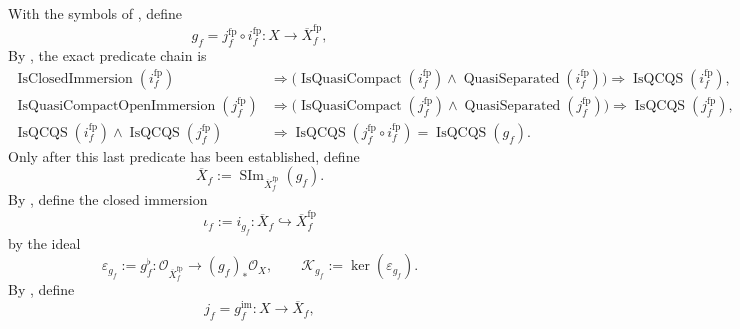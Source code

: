 \begin{definition}
\checked
  \label{def:nagata-final-compactification}
  \lean{}

  With the symbols of
  ,
  define
  \[
    g_f=j_f^{\mathrm{fp}}\circ i_f^{\mathrm{fp}}
      \colon X\longrightarrow\overline X_f^{\mathrm{fp}},
  \]
  By ,
  the exact predicate chain is
  \[
  \begin{aligned}
    \operatorname{IsClosedImmersion}(i_f^{\mathrm{fp}})
      &\Longrightarrow
        \bigl(
          \operatorname{IsQuasiCompact}(i_f^{\mathrm{fp}})\wedge
          \operatorname{QuasiSeparated}(i_f^{\mathrm{fp}})
        \bigr)
       \Longrightarrow\operatorname{IsQCQS}(i_f^{\mathrm{fp}}),\\
    \operatorname{IsQuasiCompactOpenImmersion}(j_f^{\mathrm{fp}})
      &\Longrightarrow
        \bigl(
          \operatorname{IsQuasiCompact}(j_f^{\mathrm{fp}})\wedge
          \operatorname{QuasiSeparated}(j_f^{\mathrm{fp}})
        \bigr)
       \Longrightarrow\operatorname{IsQCQS}(j_f^{\mathrm{fp}}),\\
    \operatorname{IsQCQS}(i_f^{\mathrm{fp}})\wedge
      \operatorname{IsQCQS}(j_f^{\mathrm{fp}})
      &\Longrightarrow
        \operatorname{IsQCQS}
          (j_f^{\mathrm{fp}}\circ i_f^{\mathrm{fp}})
       =\operatorname{IsQCQS}(g_f).
  \end{aligned}
  \]
  Only after this last predicate has been established, define
  \[
    \overline X_f
      :=\operatorname{SIm}_{\overline X_f^{\mathrm{fp}}}(g_f).
  \]
  By , define the closed immersion
  \[
    \iota_f:=i_{g_f}\colon\overline X_f\hookrightarrow
      \overline X_f^{\mathrm{fp}}
  \]
  by the ideal
  \[
    \varepsilon_{g_f}:=g_f^\flat\colon
      \mathcal O_{\overline X_f^{\mathrm{fp}}}
        \longrightarrow(g_f)_*\mathcal O_X,
    \qquad
    \mathcal K_{g_f}:=\ker(\varepsilon_{g_f}).
  \]
  By
  , define
  \[
    j_f=g_f^{\mathrm{im}}\colon X\longrightarrow\overline X_f,
\]
\end{definition}

